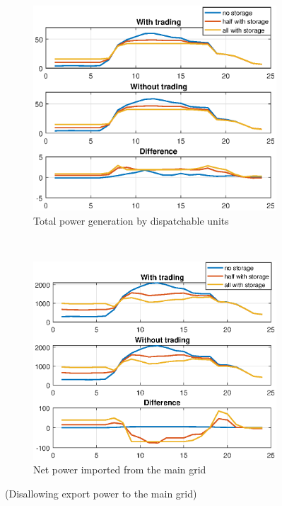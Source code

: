 \documentclass[10pt]{article}
\newtheorem{definitiox	n}{Definition}{\it}{}
\newcommand{\0}{\mathbf{0}}
\newcommand{\1}{\mathbf{1}}
\begin{document}
\begin{figure}[h]
	\centering
	\begin{subfigure}{0.5\textwidth}
		\centering
		\includegraphics[width=1\linewidth]{pdi_2.eps}
		\caption{Total power generation by dispatchable units}
	\end{subfigure}%
	~ 
	\begin{subfigure}{0.5\textwidth}
		\centering
		\includegraphics[width=1\linewidth]{pmg_2.eps}
		\caption{Net power imported from the main grid}
	\end{subfigure}
	\caption{(Disallowing export power to the main grid)}
\end{figure}
\end{document}
